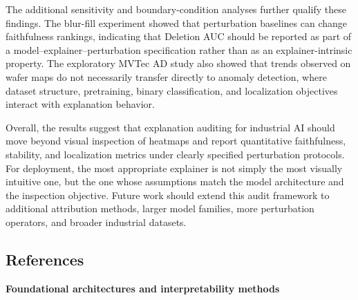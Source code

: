 \documentclass[11pt,a4paper]{article}
\begin{document}
The additional sensitivity and boundary-condition analyses further qualify these findings. The blur-fill experiment showed that perturbation baselines can change faithfulness rankings, indicating that Deletion AUC should be reported as part of a model--explainer--perturbation specification rather than as an explainer-intrinsic property. The exploratory MVTec AD study also showed that trends observed on wafer maps do not necessarily transfer directly to anomaly detection, where dataset structure, pretraining, binary classification, and localization objectives interact with explanation behavior.

Overall, the results suggest that explanation auditing for industrial AI should move beyond visual inspection of heatmaps and report quantitative faithfulness, stability, and localization metrics under clearly specified perturbation protocols. For deployment, the most appropriate explainer is not simply the most visually intuitive one, but the one whose assumptions match the model architecture and the inspection objective. Future work should extend this audit framework to additional attribution methods, larger model families, more perturbation operators, and broader industrial datasets.

\subsection*{References}

\textbf{Foundational architectures and interpretability methods}
\end{document}
